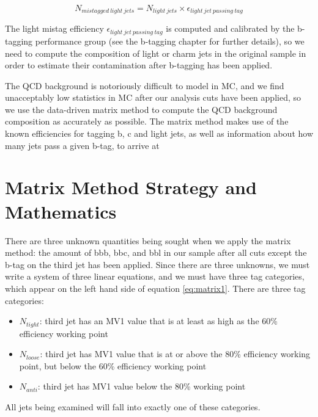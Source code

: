   \begin{equation}
	N_{mistagged\ light\ jets} = N_{light\ jets} \times \epsilon_{light\ jet\ passing\ tag}
\end{equation} \label{eq:mistag}

The light mistag efficiency $\epsilon_{light\ jet\ passing\ tag}$ is computed and calibrated by the b-tagging performance group (see the b-tagging chapter for further details), so we need to compute the composition of light or charm jets in the original sample in order to estimate their contamination after b-tagging has been applied.  

The QCD background is notoriously difficult to model in MC, and we find unacceptably low statistics in MC after our analysis cuts have been applied, so we use the data-driven matrix method to compute the QCD background composition as accurately as possible.  The matrix method makes use of the known efficiencies for tagging b, c and light jets, as well as information about how many jets pass a given b-tag, to arrive at 



\section{Matrix Method Strategy and Mathematics}


There are three unknown quantities being sought when we apply the matrix method: the amount of bbb, bbc, and bbl in our sample after all cuts except the b-tag on the third jet has been applied.   Since there are three unknowns, we must write a system of three linear equations, and we must have three tag categories, which appear on the left hand side of equation \ref{eq:matrix1}.  There are three tag categories:
	
	\begin{itemize}
		\item $N_{tight}$: third jet has an MV1 value that is at least as high as the 60\% efficiency working point
		\item $N_{loose}$: third jet has MV1 value that is at or above the 80\% efficiency working point, but below the 60\% efficiency working point
		\item $N_{anti}$: third jet has MV1 value below the 80\% working point
	\end{itemize}

All jets being examined will fall into exactly one of these categories.

